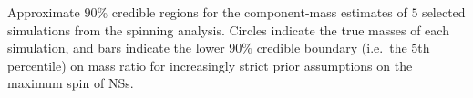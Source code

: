 \label{fig:comp_masses} Approximate $90\%$ credible regions for the component-mass estimates of $5$ selected simulations from the spinning analysis.  Circles indicate the true masses of each simulation, and bars indicate the lower $90\%$ credible boundary (i.e.\ the $5$th percentile) on mass ratio for increasingly strict prior assumptions on the maximum spin of NSs.
  
  
  
  
  